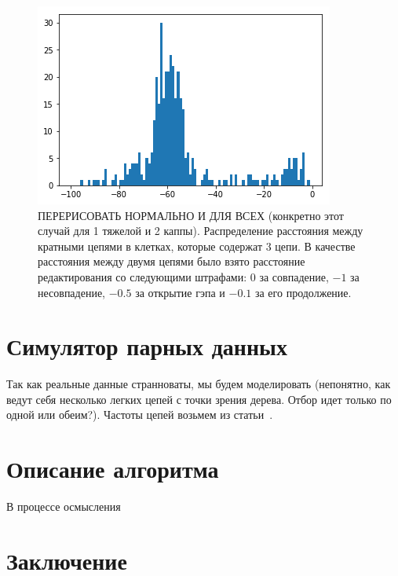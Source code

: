 \documentclass{spbau-diploma}
\begin{document}
 
 \begin{figure}[h!]
    \centering
    \includegraphics[width=.9\textwidth]{figures/HKK_hist.png}
    \caption{ПЕРЕРИСОВАТЬ НОРМАЛЬНО И ДЛЯ ВСЕХ (конкретно этот случай для 1 тяжелой и 2 каппы). Распределение расстояния между кратными цепями в клетках, которые содержат $3$ цепи.  В качестве расстояния между двумя цепями было взято расстояние редактирования со следующими штрафами: $0$ за совпадение, $-1$ за несовпадение, $-0.5$ за открытие гэпа и $-0.1$ за его продолжение.}
    \label{chains_hist}
\end{figure}

   








\section{Симулятор парных данных}

Так как реальные данные странноваты, мы будем моделировать (непонятно, как ведут себя несколько легких цепей с точки зрения дерева.
Отбор идет только по одной или обеим?).
Частоты цепей возьмем из статьи~\cite{dekosky2015depth}.




\section{Описание алгоритма}

В процессе осмысления



\section*{Заключение}



\end{document}
